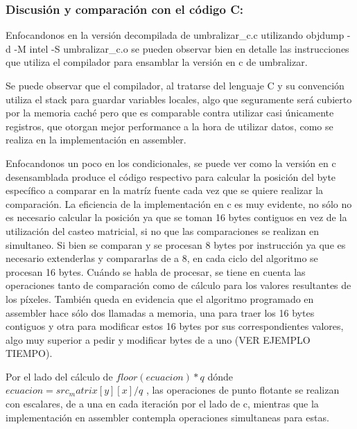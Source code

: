 \subsubsection{Discusión y comparación con el código C:}
Enfocandonos en la versión decompilada de umbralizar\_c.c utilizando objdump -d -M intel -S umbralizar\_c.o se pueden observar bien en detalle las instrucciones que utiliza el compilador para ensamblar la versión en c de umbralizar.

Se puede observar que el compilador, al tratarse del lenguaje C y su convención utiliza el stack para guardar variables locales, algo que seguramente será cubierto por la memoria caché pero que es comparable contra utilizar casi únicamente registros, que otorgan mejor performance a la hora de utilizar datos, como se realiza en la implementación en assembler.

Enfocandonos un poco en los condicionales, se puede ver como la versión en c desensamblada produce el código respectivo para calcular la posición del byte específico a comparar en la matríz fuente cada vez que se quiere realizar la comparación. La eficiencia de la implementación en c es muy evidente, no sólo no es necesario calcular la posición ya que se toman 16 bytes contiguos en vez de la utilización del casteo matricial, si no que las comparaciones se realizan en simultaneo. Si bien se comparan y se procesan 8 bytes por instrucción ya que es necesario extenderlas y compararlas de a 8, en cada ciclo del algoritmo se procesan 16 bytes. Cuándo se habla de procesar, se tiene en cuenta las operaciones tanto de comparación como de cálculo para los valores resultantes de los píxeles. También queda en evidencia que el algoritmo programado en assembler hace sólo dos llamadas a memoria, una para traer los 16 bytes contiguos y otra para modificar estos 16 bytes por sus correspondientes valores, algo muy superior a pedir y modificar bytes de a uno (VER EJEMPLO TIEMPO).

Por el lado del cálculo de $floor(ecuacion) * q$ dónde $ecuacion = src_matrix[y][x] / q$ , las operaciones de punto flotante se realizan con escalares, de a una en cada iteración por el lado de c, mientras que la implementación en assembler contempla operaciones simultaneas para estas.